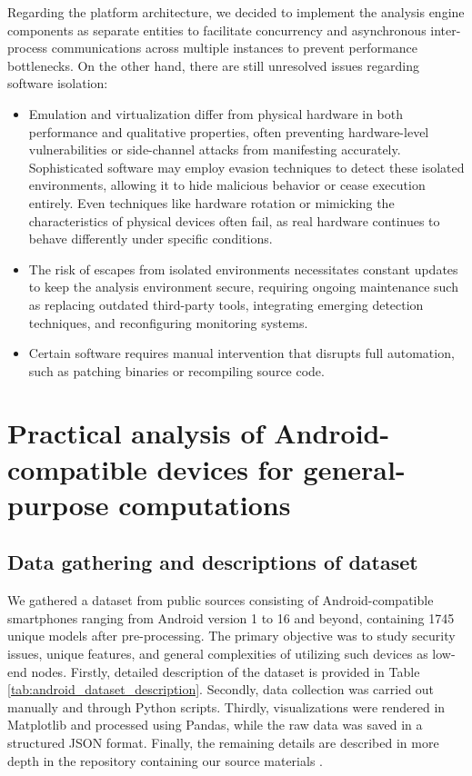 Regarding the platform architecture, we decided to implement the analysis engine components as separate entities to facilitate concurrency and asynchronous inter- process communications across multiple instances to prevent performance bottlenecks. On the other hand, there are still unresolved issues regarding software isolation:
\begin{itemize}
    \item Emulation and virtualization differ from physical hardware in both performance and qualitative properties, often preventing hardware-level vulnerabilities or side-channel attacks from manifesting accurately. Sophisticated software may employ evasion techniques to detect these isolated environments, allowing it to hide malicious behavior or cease execution entirely. Even techniques like hardware rotation or mimicking the characteristics of physical devices often fail, as real hardware continues to behave differently under specific conditions.
    \item The risk of escapes from isolated environments necessitates constant updates to keep the analysis environment secure, requiring ongoing maintenance such as replacing outdated third-party tools, integrating emerging detection techniques, and reconfiguring monitoring systems.
    \item Certain software requires manual intervention that disrupts full automation, such as patching binaries or recompiling source code.
\end{itemize}

\section{Practical analysis of Android-compatible devices for general-purpose computations}
\subsection{Data gathering and descriptions of dataset}

We gathered a dataset from public sources consisting of Android-compatible smartphones ranging from Android version 1 to 16 and beyond, containing 1745 unique models after pre-processing. The primary objective was to study security issues, unique features, and general complexities of utilizing such devices as low-end nodes. Firstly, detailed description of the dataset is provided in Table \ref{tab:android_dataset_description}. Secondly, data collection was carried out manually and through Python scripts. Thirdly, visualizations were rendered in Matplotlib and processed using Pandas, while the raw data was saved in a structured JSON format. Finally, the remaining details are described in more depth in the repository containing our source materials \cite{tendikov2026iccsfai}.

